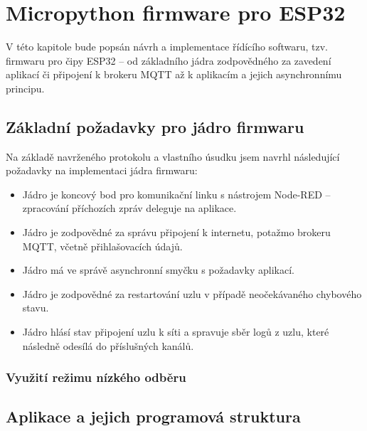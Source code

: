 \chapter{Micropython firmware pro ESP32}
\label{ch:firmware}

V této kapitole bude popsán návrh a implementace řídícího softwaru, tzv. firmwaru pro čipy ESP32 -- od základního
jádra zodpovědného za zavedení aplikací či připojení k brokeru MQTT až k aplikacím a jejich asynchronnímu principu.

\section{Základní požadavky pro jádro firmwaru}\label{sec:základní-požadavky-pro-jádro}
Na základě navrženého protokolu a vlastního úsudku jsem navrhl následující požadavky na implementaci jádra firmwaru:

\begin{itemize}
    \item Jádro je koncový bod pro komunikační linku s nástrojem Node-RED -- zpracování příchozích zpráv deleguje na
    aplikace.
    \item Jádro je zodpovědné za správu připojení k internetu, potažmo brokeru MQTT, včetně přihlašovacích údajů.
    \item Jádro má ve správě asynchronní smyčku s požadavky aplikací.
    \item Jádro je zodpovědné za restartování uzlu v případě neočekávaného chybového stavu.
    \item Jádro hlásí stav připojení uzlu k síti a spravuje sběr logů z uzlu, které následně odesílá do příslušných
    kanálů.
\end{itemize}

\subsection{Využití režimu nízkého odběru}

\section{Aplikace a jejich programová struktura}\label{sec:aplikace-a-jejich-programova-struktura}




